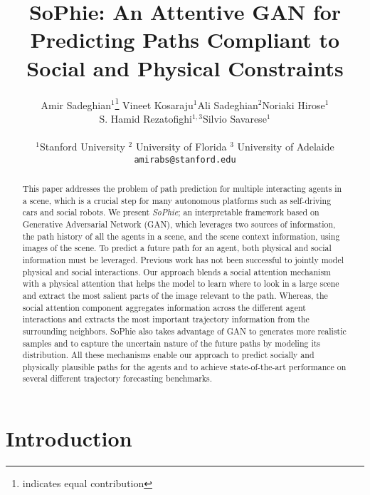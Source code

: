 \documentclass[10pt,twocolumn,letterpaper]{article}
\newcommand*\samethanks[1][\value{footnote}]{\footnotemark[#1]}
\begin{document}
\title{SoPhie: An Attentive GAN for Predicting Paths Compliant to Social and Physical Constraints}



\author{Amir Sadeghian$^1$\thanks{indicates equal contribution} \quad Vineet Kosaraju$^1$\samethanks \quad Ali Sadeghian$^2$\quad Noriaki Hirose$^1$ \\
S. Hamid Rezatofighi$^{1,3}$\quad Silvio Savarese$^1$\\
    \\
    \normalsize $^1$Stanford University \quad   $^2$ University of Florida \quad  $^3$ University of Adelaide\\
    {\tt\small amirabs@stanford.edu}
}

\maketitle


\begin{abstract}
This paper addresses the problem of path prediction for multiple interacting agents in a scene, which is a crucial step for many autonomous platforms such as self-driving cars and social robots. We present \textit{SoPhie}; an interpretable framework based on Generative Adversarial Network (GAN), which leverages two sources of information, the path history of all the agents in a scene, and the scene context information, using images of the scene. To predict a future path for an agent, both physical and social information must be leveraged. Previous work has not been successful to jointly model physical and social interactions. Our approach blends a social attention mechanism with a physical attention that helps the model to learn where to look in a large scene and extract the most salient parts of the image relevant to the path. Whereas, the social attention component aggregates information across the different agent interactions and extracts the most important trajectory information from the surrounding neighbors.
SoPhie also takes advantage of GAN to generates more realistic samples and to capture the uncertain nature of the future paths by modeling its distribution. All these mechanisms enable our approach to predict socially and physically plausible paths for the agents and to achieve state-of-the-art performance on several different trajectory forecasting benchmarks. 
\end{abstract}

\section{Introduction}
\label{sec:Introduction}
\end{document}
